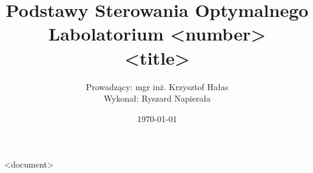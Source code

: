 \documentclass[12pt, letterpaper]{article}
\title{
    \huge Podstawy Sterowania Optymalnego\\Labolatorium <number>\\
    \large <title>
}
\author{Prowadzący: mgr inż. Krzysztof Hałas\\
        Wykonał: Ryszard Napierała}
\date{\today}
\begin{document}
    \maketitle

<document>
\end{document}
